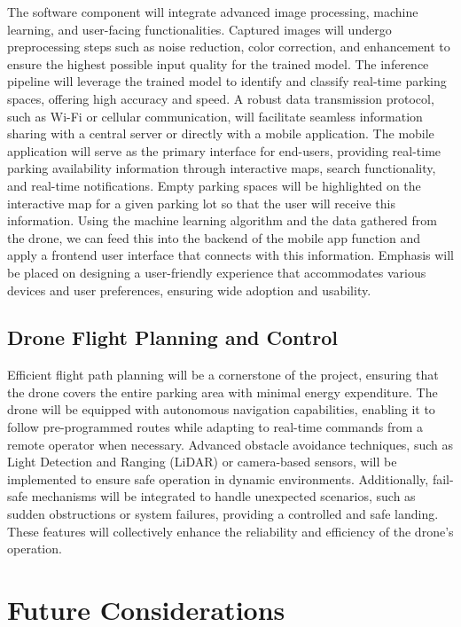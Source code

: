 \documentclass[conference]{IEEEtran}
\begin{document}
The software component will integrate advanced image processing, 
machine learning, 
and user-facing functionalities. 
Captured images will undergo preprocessing steps such as noise reduction, 
color correction, 
and enhancement to ensure the highest possible input quality for the trained model. 
The inference pipeline will leverage the trained model to identify and classify real-time parking spaces, 
offering high accuracy and speed. 
A robust data transmission protocol, 
such as Wi-Fi or cellular communication, 
will facilitate seamless information sharing with a central server or directly with a mobile application. 
The mobile application will serve as the primary interface for end-users, 
providing real-time parking availability information through interactive maps, 
search functionality, 
and real-time notifications. 
Empty parking spaces will be highlighted on the interactive map for a given parking lot so that the user will receive this information. 
Using the machine learning algorithm and the data gathered from the drone, 
we can feed this into the backend of the mobile app function and apply a frontend user interface that connects with this information. 
Emphasis will be placed on designing a user-friendly experience that accommodates various devices and user preferences, 
ensuring wide adoption and usability.

\subsection{Drone Flight Planning and Control}

Efficient flight path planning will be a cornerstone of the project, 
ensuring that the drone covers the entire parking area with minimal energy expenditure. 
The drone will be equipped with autonomous navigation capabilities, 
enabling it to follow pre-programmed routes while adapting to real-time commands from a remote operator when necessary. 
Advanced obstacle avoidance techniques, 
such as Light Detection and Ranging 
(LiDAR) 
or camera-based sensors, 
will be implemented to ensure safe operation in dynamic environments. 
Additionally, 
fail-safe mechanisms will be integrated to handle unexpected scenarios, 
such as sudden obstructions or system failures, 
providing a controlled and safe landing. 
These features will collectively enhance the reliability and efficiency of the drone's operation.

\section{Future Considerations}
\end{document}
